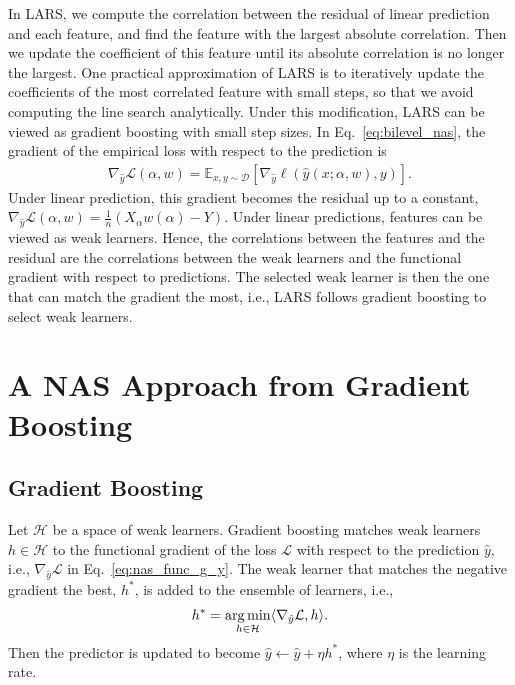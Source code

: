 In LARS, we compute the correlation between the residual of linear prediction and
each feature, and find the feature with the largest absolute correlation. Then we update the 
coefficient of this feature until its absolute correlation is no longer the largest.
One practical approximation of LARS is to iteratively update the coefficients of the most 
correlated feature with small steps, so that we avoid computing the line search analytically. 
Under this modification, LARS can be viewed as gradient boosting with small step sizes.
In Eq.~\ref{eq:bilevel_nas}, the gradient of the empirical loss with respect to the prediction is 
\begin{align}
\nabla _{\hat{y}} \mathcal{L} (\alpha, w) = 
\mathbb{E} _{x, y \sim \mathcal{D}} [ \nabla _{\hat{y}} \ell(\hat{y}(x ; \alpha, w), y) ].
\label{eq:nas_func_g_y}
\end{align}
Under linear prediction, this gradient becomes the residual up to a constant, 
$
\nabla _{\hat{y}} \mathcal{L} (\alpha, w) = \frac{1}{n}(X_{\alpha}w(\alpha) - Y).
$
Under linear predictions, features can be viewed as weak learners. 
Hence, the correlations between the features and the residual are
the correlations between the weak learners and the functional gradient with respect to predictions.
The selected weak learner is then the one that can match the gradient the most, i.e., 
LARS follows gradient boosting to select weak learners.






\section{A NAS Approach from Gradient Boosting}



\subsection{Gradient Boosting}
\label{sec:gb_review_nas}
Let $\mathcal{H}$ be a space of weak learners. 
Gradient boosting matches weak learners $h \in \mathcal{H}$ to 
the functional gradient of the loss $\mathcal{L}$ with respect to the prediction $\hat{y}$, 
i.e., $\nabla _{\hat{y}} \mathcal{L}$ in Eq.~\ref{eq:nas_func_g_y}.
The weak learner that matches the negative gradient the best, $h^*$, is added to the ensemble of learners, i.e.,
\begin{align}
h^* = \operatorname*{arg\,min} _{h \in \mathcal{H}} \langle \nabla _{\hat{y}} \mathcal{L}, h \rangle.
\end{align}
Then the predictor is updated to become $\hat{y} \leftarrow \hat{y} + \eta h^*$, where $\eta$ is the learning rate.

